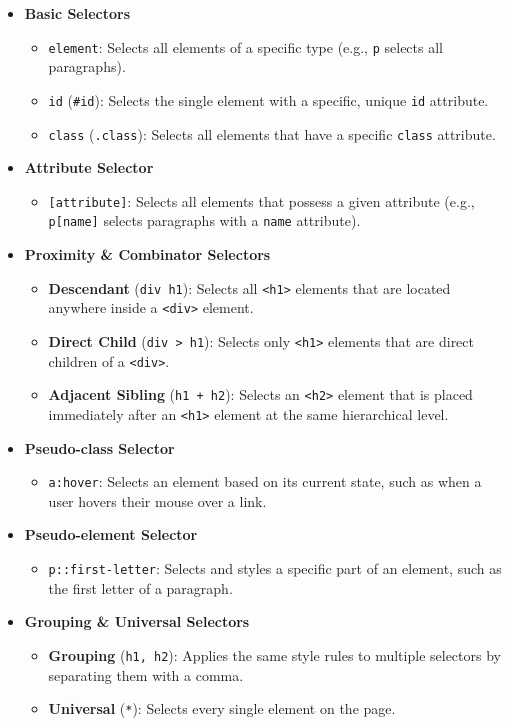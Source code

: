\documentclass{scrbook}
\begin{document}
\begin{itemize}
    \item \textbf{Basic Selectors}
    \begin{itemize}
        \item \texttt{element}: Selects all elements of a specific type (e.g., \texttt{p} selects all paragraphs).
        \item \texttt{id} (\texttt{\#id}): Selects the single element with a specific, unique \texttt{id} attribute.
        \item \texttt{class} (\texttt{.class}): Selects all elements that have a specific \texttt{class} attribute.
    \end{itemize}
    \item \textbf{Attribute Selector}
    \begin{itemize}
        \item \texttt{[attribute]}: Selects all elements that possess a given attribute (e.g., \texttt{p[name]} selects paragraphs with a \texttt{name} attribute).
    \end{itemize}
    \item \textbf{Proximity \& Combinator Selectors}
    \begin{itemize}
        \item \textbf{Descendant} (\texttt{div h1}): Selects all \texttt{<h1>} elements that are located anywhere inside a \texttt{<div>} element.
        \item \textbf{Direct Child} (\texttt{div > h1}): Selects only \texttt{<h1>} elements that are direct children of a \texttt{<div>}.
        \item \textbf{Adjacent Sibling} (\texttt{h1 + h2}): Selects an \texttt{<h2>} element that is placed immediately after an \texttt{<h1>} element at the same hierarchical level.
    \end{itemize}
    \item \textbf{Pseudo-class Selector}
    \begin{itemize}
        \item \texttt{a:hover}: Selects an element based on its current state, such as when a user hovers their mouse over a link.
    \end{itemize}
    \item \textbf{Pseudo-element Selector}
    \begin{itemize}
        \item \texttt{p::first-letter}: Selects and styles a specific part of an element, such as the first letter of a paragraph.
    \end{itemize}
    \item \textbf{Grouping \& Universal Selectors}
    \begin{itemize}
        \item \textbf{Grouping} (\texttt{h1, h2}): Applies the same style rules to multiple selectors by separating them with a comma.
        \item \textbf{Universal} (\texttt{*}): Selects every single element on the page.
    \end{itemize}
\end{itemize}
\end{document}
